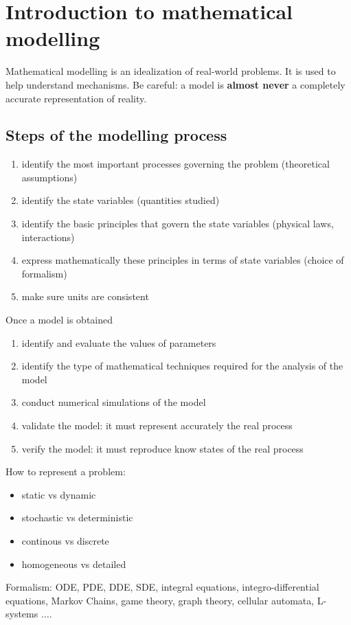 \chapter{Introduction to mathematical modelling}
\label{chap:intro_model}


Mathematical modelling is an idealization of real-world problems. It is used to
help understand mechanisms. Be careful: a model is \textbf{almost never} a completely accurate representation of reality.


\section{Steps of the modelling process}
\begin{enumerate}
\item identify the most important processes governing the problem (theoretical assumptions)
\item identify the state variables (quantities studied)
\item identify the basic principles that govern the state variables (physical
laws, interactions)
\item express mathematically these principles in terms of state variables (choice of formalism)
\item make sure units are consistent
\end{enumerate}
Once a model is obtained
\begin{enumerate}
\item identify and evaluate the values of parameters
\item identify the type of mathematical techniques required for the analysis of the model
\item conduct numerical simulations of the model
\item validate the model: it must represent accurately the real process
\item verify the model: it must reproduce know states of the real process
\end{enumerate}

How to represent a problem:
\begin{itemize}
\item static vs dynamic
\item stochastic vs deterministic
\item continous vs discrete
\item homogeneous vs detailed
\end{itemize}
Formalism:
ODE, PDE, DDE, SDE, integral equations, integro-differential equations, Markov Chains, game theory, graph theory, cellular automata, L-systems $\dots$.




